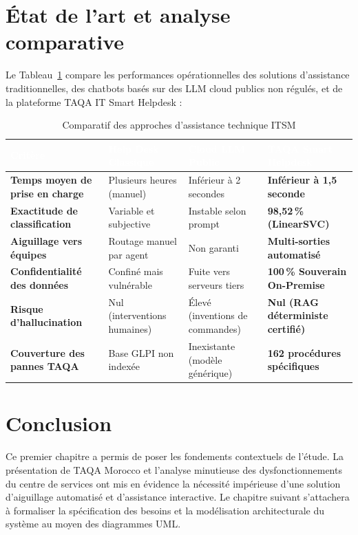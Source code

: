 \documentclass[12pt, a4paper, oneside]{report}
\begin{document}
\section{État de l'art et analyse comparative}

Le Tableau~\ref{tab:etat-art} compare les performances opérationnelles des solutions d'assistance traditionnelles, des chatbots basés sur des LLM cloud publics non régulés, et de la plateforme TAQA IT Smart Helpdesk :

\begin{table}[H]
\centering
\caption{Comparatif des approches d'assistance technique ITSM}
\label{tab:etat-art}
\begin{tabularx}{\textwidth}{|>{\bfseries}p{4cm}|X|X|X|}
\hline
\rowcolor{themeDark}
\textcolor{white}{Critère} &
\textcolor{white}{Help Desk Classique} &
\textcolor{white}{Cloud LLM Public} &
\textcolor{white}{TAQA Smart Helpdesk} \\
\hline
Temps moyen de prise en charge & Plusieurs heures (manuel) & Inférieur à 2 secondes & \textbf{Inférieur à 1,5 seconde} \\
\hline
Exactitude de classification & Variable et subjective & Instable selon prompt & \textbf{98,52\,\% (LinearSVC)} \\
\hline
Aiguillage vers équipes & Routage manuel par agent & Non garanti & \textbf{Multi-sorties automatisé} \\
\hline
Confidentialité des données & Confiné mais vulnérable & Fuite vers serveurs tiers & \textbf{100\,\% Souverain On-Premise} \\
\hline
Risque d'hallucination & Nul (interventions humaines) & Élevé (inventions de commandes) & \textbf{Nul (RAG déterministe certifié)} \\
\hline
Couverture des pannes TAQA & Base GLPI non indexée & Inexistante (modèle générique) & \textbf{162 procédures spécifiques} \\
\hline
\end{tabularx}
\end{table}

\section{Conclusion}

Ce premier chapitre a permis de poser les fondements contextuels de l'étude. La présentation de TAQA Morocco et l'analyse minutieuse des dysfonctionnements du centre de services ont mis en évidence la nécessité impérieuse d'une solution d'aiguillage automatisé et d'assistance interactive. Le chapitre suivant s'attachera à formaliser la spécification des besoins et la modélisation architecturale du système au moyen des diagrammes UML.
\end{document}
